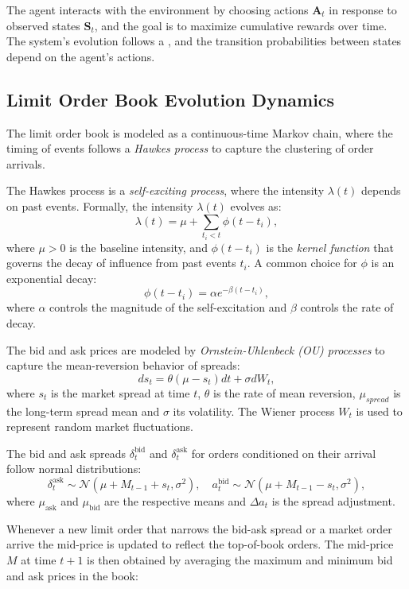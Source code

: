 The agent interacts with the environment by choosing actions \( \mathbf{A}_t \) in response to observed states \( \mathbf{S}_t \), and the goal is to maximize cumulative rewards over time. The system's evolution follows a , and the transition probabilities between states depend on the agent's actions.

\subsection{Limit Order Book Evolution Dynamics}
The limit order book is modeled as a continuous-time Markov chain, where the timing of events follows a \textit{Hawkes process} to capture the clustering of order arrivals.

The Hawkes process is a \textit{self-exciting process}, where the intensity \( \lambda(t) \) depends on past events. Formally, the intensity \( \lambda(t) \) evolves as:
$$
\lambda(t) = \mu + \sum_{t_i < t} \phi(t - t_i),
$$
where \( \mu > 0 \) is the baseline intensity, and \( \phi(t - t_i) \) is the \textit{kernel function} that governs the decay of influence from past events \( t_i \). A common choice for \( \phi \) is an exponential decay:
$$
\phi(t - t_i) = \alpha e^{-\beta (t - t_i)},
$$
where \( \alpha \) controls the magnitude of the self-excitation and \( \beta \) controls the rate of decay.

The bid and ask prices are modeled by \textit{Ornstein-Uhlenbeck (OU) processes} to capture the mean-reversion behavior of spreads:
$$
ds_t = \theta(\mu - s_t) dt + \sigma dW_t,
$$
where \( s_t \) is the market spread at time \( t \), \( \theta \) is the rate of mean reversion, \( \mu_{spread} \) is the long-term spread mean and \( \sigma \) its volatility. The Wiener process \( W_t \) is used to represent random market fluctuations.

The bid and ask spreads \( \delta_t^{\text{bid}} \) and \( \delta_t^{\text{ask}} \) for orders conditioned on their arrival follow normal distributions:
$$
\delta_t^{\text{ask}} \sim \mathcal{N}(\mu + M_{t-1} + s_t, \sigma^2), \quad a_t^{\text{bid}} \sim \mathcal{N}(\mu + M_{t-1} - s_t, \sigma^2),
$$
where \( \mu_{\text{ask}} \) and \( \mu_{\text{bid}} \) are the respective means and \( \Delta a_t \) is the spread adjustment.

Whenever a new limit order that narrows the bid-ask spread or a market order arrive the mid-price is updated to reflect the top-of-book orders. The mid-price \( M \) at time $t+1$ is then obtained by averaging the maximum and minimum bid and ask prices in the book:

